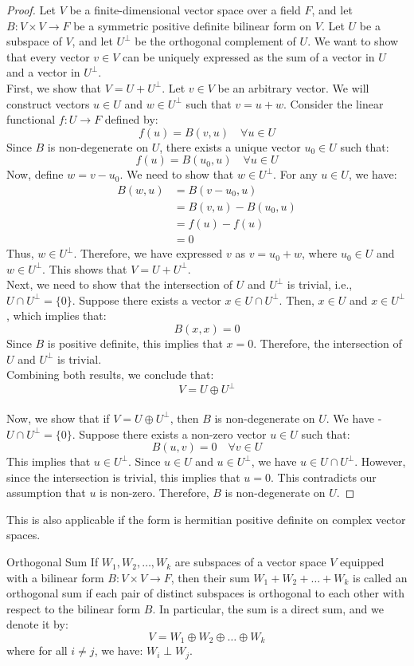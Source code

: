 \documentclass[openany]{book}
\begin{document}
\begin{proof}
Let $V$ be a finite-dimensional vector space over a field $F$, and let $B: V \times V \to F$ be a symmetric positive definite bilinear form on $V$. Let $U$ be a subspace of $V$, and let $U^\perp$ be the orthogonal complement of $U$. We want to show that every vector $v \in V$ can be uniquely expressed as the sum of a vector in $U$ and a vector in $U^\perp$. \\
First, we show that $V = U + U^\perp$. Let $v \in V$ be an arbitrary vector. We will construct vectors $u \in U$ and $w \in U^\perp$ such that $v = u + w$. Consider the linear functional $f: U \to F$ defined by:
$$f(u) = B(v, u) \quad \forall u \in U$$
Since $B$ is non-degenerate on $U$, there exists a unique vector $u_0 \in U$ such that:
$$f(u) = B(u_0, u) \quad \forall u \in U$$
Now, define $w = v - u_0$. We need to show that $w \in U^\perp$. For any $u \in U$, we have:
\[\begin{aligned}
B(w, u) &= B(v - u_0, u) \\
&= B(v, u) - B(u_0, u) \\
&= f(u) - f(u) \\
&= 0
\end{aligned}\]
Thus, $w \in U^\perp$. Therefore, we have expressed $v$ as $v = u_0 + w$, where $u_0 \in U$ and $w \in U^\perp$. This shows that $V = U + U^\perp$. \\
Next, we need to show that the intersection of $U$ and $U^\perp$ is trivial, i.e., $U \cap U^\perp = \{0\}$. Suppose there exists a vector $x \in U \cap U^\perp$. Then, $x \in U$ and $x \in U^\perp$, which implies that:
$$B(x, x) = 0$$
Since $B$ is positive definite, this implies that $x = 0$. Therefore, the intersection of $U$ and $U^\perp$ is trivial. \\
Combining both results, we conclude that:
$$V = U \oplus U^\perp$$ \\
Now, we show that if $V = U \oplus U^\perp$, then $B$ is non-degenerate on $U$. We have - 
$U \cap U^\perp = \{0\}$. Suppose there exists a non-zero vector $u \in U$ such that:
$$B(u, v) = 0 \quad \forall v \in U$$
This implies that $u \in U^\perp$. Since $u \in U$ and $u \in U^\perp$, we have $u \in U \cap U^\perp$. However, since the intersection is trivial, this implies that $u = 0$. This contradicts our assumption that $u$ is non-zero. Therefore, $B$ is non-degenerate on $U$.
\end{proof}
\begin{mynote}
    This is also applicable if the form is hermitian positive definite on complex vector spaces.
\end{mynote}
\begin{mydefinition}{Orthogonal Sum}
    If $W_1, W_2, \ldots, W_k$ are subspaces of a vector space $V$ equipped with a bilinear form $B: V \times V \to F$, then their sum $W_1 + W_2 + \ldots + W_k$ is called an orthogonal sum if each pair of distinct subspaces is orthogonal to each other with respect to the bilinear form $B$. In particular, the sum is a direct sum, and we denote it by:
    $$V = W_1 \oplus W_2 \oplus \ldots \oplus W_k$$
    where for all $i \neq j$, we have:
    $W_i \perp W_j$.
\end{mydefinition}
\end{document}
